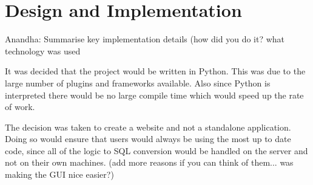 \documentclass[a4paper, 11pt]{article}
\begin{document}
\section{Design and Implementation}
  Anandha: Summarise key implementation details (how did you do it? what technology was
  used


  It was decided that the project would be written in Python. This was due to
  the large number of plugins and frameworks available. Also since Python is
  interpreted there would be no large compile time which would speed up the rate
  of work.

  The decision was taken to create a website and not a standalone application.
  Doing so would ensure that users would always be using the most up to date
  code, since all of the logic to SQL conversion would be handled on the server
  and not on their own machines. (add more reasons if you can think of them...
  was making the GUI nice easier?)


                 
\end{document}
